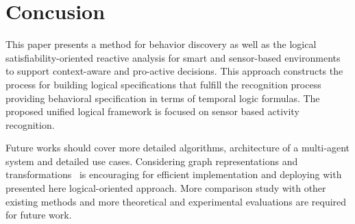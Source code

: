 \documentclass[runningheads,a4paper]{llncs}
\begin{document}
\section{Concusion}
\label{sec:conclusion}

This paper presents a method for behavior discovery
as well as the logical satisfiability-oriented reactive analysis
for smart and sensor-based environments to support context-aware and pro-active decisions.
This approach constructs the process for building logical specifications that
fulfill the recognition process providing behavioral specification
in terms of temporal logic formulas.
The proposed unified logical framework is focused on sensor based activity recognition.

Future works should cover more detailed algorithms,
architecture of a multi-agent system and detailed use cases.
Considering graph representations and transformations~\cite{Kotulski-Sedziwy-2011,Kotulski-Sedziwy-2010} is encouraging for
efficient implementation and deploying with presented here logical-oriented approach.
More comparison study with other existing methods and more
theoretical and experimental evaluations are required for future work.








\end{document}
